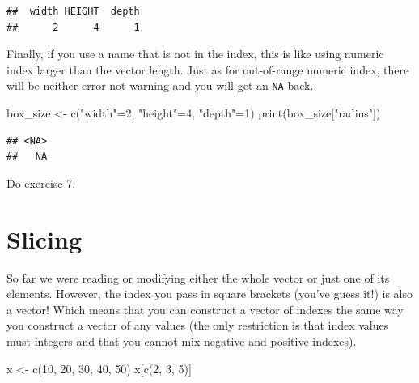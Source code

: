 \documentclass[
]{book}
\newenvironment{Shaded}{\begin{snugshade}}{\end{snugshade}}
\newcommand{\DecValTok}[1]{\textcolor[rgb]{0.00,0.00,0.81}{#1}}
\newcommand{\FunctionTok}[1]{\textcolor[rgb]{0.00,0.00,0.00}{#1}}
\newcommand{\NormalTok}[1]{#1}
\newcommand{\OtherTok}[1]{\textcolor[rgb]{0.56,0.35,0.01}{#1}}
\newcommand{\StringTok}[1]{\textcolor[rgb]{0.31,0.60,0.02}{#1}}
\begin{document}
\begin{verbatim}
##  width HEIGHT  depth 
##      2      4      1
\end{verbatim}

Finally, if you use a name that is not in the index, this is like using numeric index larger than the vector length. Just as for out-of-range numeric index, there will be neither error not warning and you will get an \texttt{NA} back.

\begin{Shaded}
\begin{Highlighting}[]
\NormalTok{box\_size }\OtherTok{\textless{}{-}} \FunctionTok{c}\NormalTok{(}\StringTok{"width"}\OtherTok{=}\DecValTok{2}\NormalTok{, }\StringTok{"height"}\OtherTok{=}\DecValTok{4}\NormalTok{, }\StringTok{"depth"}\OtherTok{=}\DecValTok{1}\NormalTok{) }
\FunctionTok{print}\NormalTok{(box\_size[}\StringTok{"radius"}\NormalTok{])}
\end{Highlighting}
\end{Shaded}

\begin{verbatim}
## <NA> 
##   NA
\end{verbatim}

Do exercise 7.

\hypertarget{vector-index-slicing}{%
\section{Slicing}\label{vector-index-slicing}}

So far we were reading or modifying either the whole vector or just one of its elements. However, the index you pass in square brackets (you've guess it!) is also a vector! Which means that you can construct a vector of indexes the same way you construct a vector of any values (the only restriction is that index values must integers and that you cannot mix negative and positive indexes).

\begin{Shaded}
\begin{Highlighting}[]
\NormalTok{x }\OtherTok{\textless{}{-}} \FunctionTok{c}\NormalTok{(}\DecValTok{10}\NormalTok{, }\DecValTok{20}\NormalTok{, }\DecValTok{30}\NormalTok{, }\DecValTok{40}\NormalTok{, }\DecValTok{50}\NormalTok{)}
\NormalTok{x[}\FunctionTok{c}\NormalTok{(}\DecValTok{2}\NormalTok{, }\DecValTok{3}\NormalTok{, }\DecValTok{5}\NormalTok{)]}
\end{Highlighting}
\end{Shaded}
\end{document}
